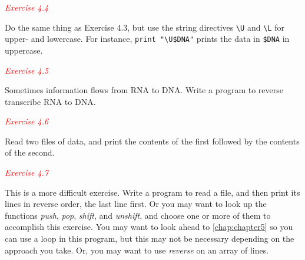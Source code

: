 \textcolor{red}{\textit{Exercise 4.4}}
\begin{adjustwidth}{2em}{}
Do the same thing as Exercise 4.3, but use the string directives \verb|\U| and \verb|\L| for upper- and lowercase. For instance, \verb|print "\U$DNA"| prints the data in \verb|$DNA| in uppercase. 
\end{adjustwidth}

\textcolor{red}{\textit{Exercise 4.5}}
\begin{adjustwidth}{2em}{}
Sometimes information flows from RNA to DNA. Write a program to reverse transcribe RNA to DNA. 
\end{adjustwidth}

\textcolor{red}{\textit{Exercise 4.6}}
\begin{adjustwidth}{2em}{}
Read two files of data, and print the contents of the first followed by the contents of the second. 
\end{adjustwidth}

\textcolor{red}{\textit{Exercise 4.7}}
\begin{adjustwidth}{2em}{}
This is a more difficult exercise. Write a program to read a file, and then print its lines in reverse order, the last line first. Or you may want to look up the functions \textit{push}, \textit{pop}, \textit{shift}, and \textit{unshift}, and choose one or more of them to accomplish this exercise. You may want to look ahead to \autoref{chap:chapter5} so you can use a loop in this program, but this may not be necessary depending on the approach you take. Or, you may want to use \textit{reverse} on an array of lines. 
\end{adjustwidth}

